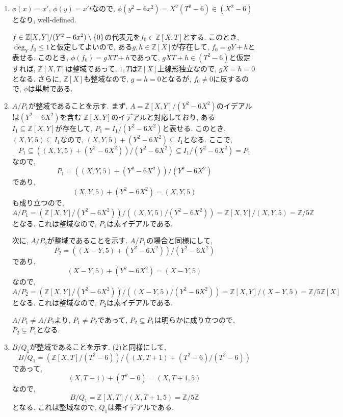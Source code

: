\documentclass[dvipdfmx]{jsarticle}
\begin{document}
    \begin{enumerate}
        \item $\phi(x) = x'$, $\phi(y) = x't$なので,
        $\phi(y^2-6x^2) = X^2(T^2-6) \in (X^2-6)$となり, well-defined.

        $f \in \mathbb{Z}[X,Y]/(Y^2-6x^2) \setminus \{0\}$の代表元を$f_0 \in \mathbb{Z}[X,T]$とする.
        このとき, $\deg_Y{f_0} \leq 1$と仮定してよいので,
        ある$g, h \in \mathbb{Z}[X]$が存在して, $f_0 = gY+ h$と表せる.
        このとき,
        $\phi(f_0) = gXT + h$であって,
        $gXT + h \in (T^2-6)$と仮定すれば, $\mathbb{Z}[X,T]$は整域であって,
        $1, T$は$\mathbb{Z}[X]$上線形独立なので,
        $gX = h = 0$となる.
        さらに, $\mathbb{Z}[X]$も整域なので, $g = h = 0$となるが,
        $f_0 \neq 0$に反するので, $\phi$は単射である.
        \item $A/P_1$が整域であることを示す.
        まず, $A = \mathbb{Z}[X,Y]/(Y^2-6X^2)$のイデアルは$(Y^2-6X^2)$を含む
        $\mathbb{Z}[X,Y]$のイデアルと対応しており,
        ある$I_1 \subseteq \mathbb{Z}[X,Y]$が存在して,
        $P_1 = I_1/(Y^2-6X^2)$と表せる.
        このとき, $(X,Y,5) \subseteq I_1$なので,
        $(X,Y,5) + (Y^2-6X^2) \subseteq I_1$となる.
        ここで,
        \[
            P_1 \subseteq ((X,Y,5) + (Y^2-6X^2))/(Y^2-6X^2) \subseteq I_1/(Y^2-6X^2) = P_1
        \]
        なので,
        \[
            P_1 = ((X,Y,5) + (Y^2-6X^2))/(Y^2-6X^2)
        \]
        であり,
        \[
            (X,Y,5) + (Y^2-6X^2) = (X, Y, 5)
        \]
        も成り立つので,
        \[
            A/P_1 = (\mathbb{Z}[X, Y]/(Y^2-6X^2))/((X,Y,5)/(Y^2-6X^2)) = \mathbb{Z}[X, Y]/(X,Y,5) = \mathbb{Z}/5\mathbb{Z}
        \]
        となる.
        これは整域なので, $P_1$は素イデアルである.

        次に, $A/P_2$が整域であることを示す.
        $A/P_1$の場合と同様にして,
        \[
            P_2 = ((X-Y, 5) + (Y^2-6X^2))/(Y^2-6X^2)
        \]
        であり,
        \[
            (X-Y, 5) + (Y^2-6X^2) = (X-Y, 5)
        \]
        なので,
        \[
            A/P_2 = (\mathbb{Z}[X, Y]/(Y^2-6X^2))/((X-Y,5)/(Y^2-6X^2)) = \mathbb{Z}[X, Y]/(X-Y,5) = \mathbb{Z}/5\mathbb{Z}[X]
        \]
        となる.
        これは整域なので, $P_2$は素イデアルである.

        $A/P_1 \neq A/P_2$より, $P_1 \neq P_2$であって,
        $P_2 \subseteq P_1$は明らかに成り立つので,
        $P_2 \subsetneq P_1$となる.
        \item $B/Q_1$が整域であることを示す.
        (2)と同様にして,
        \[
            B/Q_1 = (\mathbb{Z}[X, T]/(T^2-6))/((X, T+1) + (T^2 -6)/(T^2-6))
        \]
        であって,
        \[
            (X, T+1) + (T^2 - 6) = (X, T+1, 5)
        \]
        なので,
        \[
            B/Q_1 = \mathbb{Z}[X, T]/(X, T+1, 5)  = \mathbb{Z}/5\mathbb{Z}
        \]
        となる.
        これは整域なので, $Q_1$は素イデアルである.


\end{enumerate}
\end{document}
